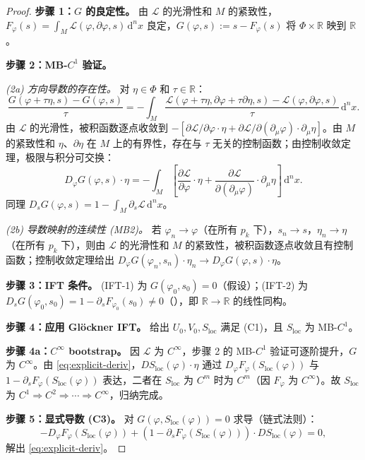 \documentclass[12pt,a4paper]{article}
\theoremstyle{definition}
\newcommand{\mL}{\mathcal{L}}
\newcommand{\mPhi}{\Phi}
\newcommand{\R}{\mathbb{R}}
\newcommand{\diff}{\mathrm{d}}
\newcommand{\dVol}{\,\diff^n x}
\begin{document}
\begin{proof}
\textbf{步骤 1：$G$ 的良定性。} 由 $\mL$ 的光滑性和 $M$ 的紧致性，$F_\varphi(s) = \int_M \mL(\varphi, \partial\varphi, s) \dVol$ 良定，$G(\varphi, s) := s - F_\varphi(s)$ 将 $\mPhi \times \R$ 映到 $\R$。

\textbf{步骤 2：MB-$C^1$ 验证。}

\emph{(2a) 方向导数的存在性。} 对 $\eta \in \mPhi$ 和 $\tau \in \R$：
\[ \frac{G(\varphi + \tau\eta, s) - G(\varphi, s)}{\tau} = -\int_M \frac{\mL(\varphi + \tau\eta, \partial\varphi + \tau\partial\eta, s) - \mL(\varphi, \partial\varphi, s)}{\tau} \dVol. \]
由 $\mL$ 的光滑性，被积函数逐点收敛到 $-[\partial\mL/\partial\varphi \cdot \eta + \partial\mL/\partial(\partial_\mu\varphi) \cdot \partial_\mu\eta]$。由 $M$ 的紧致性和 $\eta$、$\partial\eta$ 在 $M$ 上的有界性，存在与 $\tau$ 无关的控制函数；由控制收敛定理，极限与积分可交换：
\[ D_\varphi G(\varphi, s) \cdot \eta = -\int_M \left[\frac{\partial\mL}{\partial\varphi} \cdot \eta + \frac{\partial\mL}{\partial(\partial_\mu\varphi)} \cdot \partial_\mu\eta\right] \dVol. \]
同理 $D_s G(\varphi, s) = 1 - \int_M \partial_s \mL \dVol$。

\emph{(2b) 导数映射的连续性 (MB2)。} 若 $\varphi_n \to \varphi$（在所有 $p_k$ 下），$s_n \to s$，$\eta_n \to \eta$（在所有 $p_k$ 下），则由 $\mL$ 的光滑性和 $M$ 的紧致性，被积函数逐点收敛且有控制函数；控制收敛定理给出 $D_\varphi G(\varphi_n, s_n) \cdot \eta_n \to D_\varphi G(\varphi, s) \cdot \eta$。

\textbf{步骤 3：IFT 条件。} (IFT-1) 为 $G(\varphi_0, s_0) = 0$（假设）；(IFT-2) 为 $D_s G(\varphi_0, s_0) = 1 - \partial_s F_{\varphi_0}(s_0) \neq 0$（），即 $\R \to \R$ 的线性同构。

\textbf{步骤 4：应用 Gl\"ockner IFT。} 给出 $U_0, V_0, S_{\mathrm{loc}}$ 满足 (C1)，且 $S_{\mathrm{loc}}$ 为 MB-$C^1$。

\textbf{步骤 4a：$C^\infty$ bootstrap。} 因 $\mL$ 为 $C^\infty$，步骤 2 的 MB-$C^1$ 验证可逐阶提升，$G$ 为 $C^\infty$。由 \eqref{eq:explicit-deriv}，$DS_{\mathrm{loc}}(\varphi)\cdot\eta$ 通过 $D_\varphi F_\varphi(S_{\mathrm{loc}}(\varphi))$ 与 $1 - \partial_s F_\varphi(S_{\mathrm{loc}}(\varphi))$ 表达，二者在 $S_{\mathrm{loc}}$ 为 $C^m$ 时为 $C^m$（因 $F_\varphi$ 为 $C^\infty$）。故 $S_{\mathrm{loc}}$ 为 $C^1 \Rightarrow C^2 \Rightarrow \cdots \Rightarrow C^\infty$，归纳完成。

\textbf{步骤 5：显式导数 (C3)。} 对 $G(\varphi, S_{\mathrm{loc}}(\varphi)) = 0$ 求导（链式法则）：
\[ -D_\varphi F_\varphi(S_{\mathrm{loc}}(\varphi)) + (1 - \partial_s F_\varphi(S_{\mathrm{loc}}(\varphi))) \cdot DS_{\mathrm{loc}}(\varphi) = 0, \]
解出 \eqref{eq:explicit-deriv}。
\end{proof}
\end{document}
